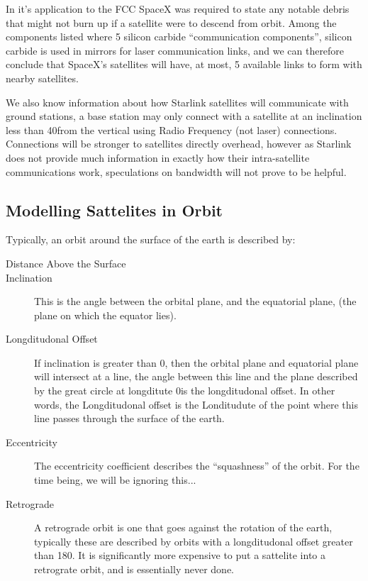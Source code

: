 \documentclass[12pt]{article}
\begin{document}
In it's application to the FCC SpaceX was required to state any notable debris that might not burn up if a satellite were to descend from orbit. Among the components listed where 5 silicon carbide “communication components”, silicon carbide is used in mirrors for laser communication links, and we can therefore conclude that SpaceX's satellites will have, at most, 5 available links to form with nearby satellites.

We also know information about how Starlink satellites will communicate with ground stations, a base station may only connect with a satellite at an inclination less than 40\degree from the vertical using Radio Frequency (not laser) connections. Connections will be stronger to satellites directly overhead, however as Starlink does not provide much information in exactly how their intra-satellite communications work, speculations on bandwidth will not prove to be helpful.

\subsection{Modelling Sattelites in Orbit}

Typically, an orbit around the surface of the earth is described by:

\begin{description}
\item[Distance Above the Surface]
\item[Inclination]
This is the angle between the orbital plane, and the equatorial plane, (the plane on which the equator lies).
\item[Longditudonal Offset]
If inclination is greater than 0\degree, then the orbital plane and equatorial plane will intersect at a line, the angle between this line and the plane described by the great circle at longditute 0\degree is the longditudonal offset. In other words, the Longditudonal offset is the Londitudute of the point where this line passes through the surface of the earth.
\item[Eccentricity]
The eccentricity coefficient describes the “squashness” of the orbit. For the time being, we will be ignoring this...
\item[Retrograde]
A retrograde orbit is one that goes against the rotation of the earth, typically these are described by orbits with a longditudonal offset greater than 180\degree. It is significantly more expensive to put a sattelite into a retrograte orbit, and is essentially never done.
\end{description}
\end{document}
